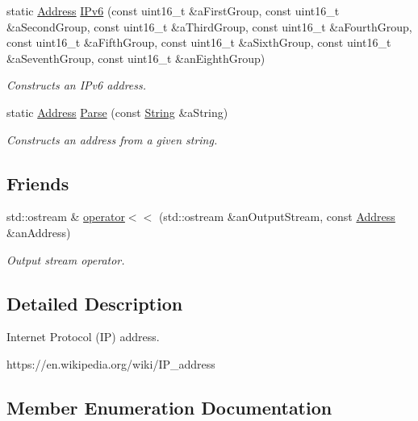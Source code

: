 \begin{DoxyCompactItemize}
static \hyperlink{classostk_1_1io_1_1ip_1_1_address}{Address} \hyperlink{classostk_1_1io_1_1ip_1_1_address_a3f41fa50dd97310ed8d88e5097b9c038}{I\+Pv6} (const uint16\+\_\+t \&a\+First\+Group, const uint16\+\_\+t \&a\+Second\+Group, const uint16\+\_\+t \&a\+Third\+Group, const uint16\+\_\+t \&a\+Fourth\+Group, const uint16\+\_\+t \&a\+Fifth\+Group, const uint16\+\_\+t \&a\+Sixth\+Group, const uint16\+\_\+t \&a\+Seventh\+Group, const uint16\+\_\+t \&an\+Eighth\+Group)
\begin{DoxyCompactList}\small\item\em Constructs an I\+Pv6 address. \end{DoxyCompactList}\item 
static \hyperlink{classostk_1_1io_1_1ip_1_1_address}{Address} \hyperlink{classostk_1_1io_1_1ip_1_1_address_a3d60e44d816e30f17db36f9bb7ac6307}{Parse} (const \hyperlink{namespaceostk_1_1io_1_1ip_a987b35b1bc61a18b66c2a45f9ce5536e}{String} \&a\+String)
\begin{DoxyCompactList}\small\item\em Constructs an address from a given string. \end{DoxyCompactList}\end{DoxyCompactItemize}
\subsection*{Friends}
\begin{DoxyCompactItemize}
\item 
std\+::ostream \& \hyperlink{classostk_1_1io_1_1ip_1_1_address_acb0766764bb037acde8e0acdfdecadd0}{operator$<$$<$} (std\+::ostream \&an\+Output\+Stream, const \hyperlink{classostk_1_1io_1_1ip_1_1_address}{Address} \&an\+Address)
\begin{DoxyCompactList}\small\item\em Output stream operator. \end{DoxyCompactList}\end{DoxyCompactItemize}


\subsection{Detailed Description}
Internet Protocol (IP) address. 

https\+://en.wikipedia.\+org/wiki/\+I\+P\+\_\+address 

\subsection{Member Enumeration Documentation}
\mbox{\label{classostk_1_1io_1_1ip_1_1_address_a03b78ae8f7ddbb893d7396e6a1baf695}} 
